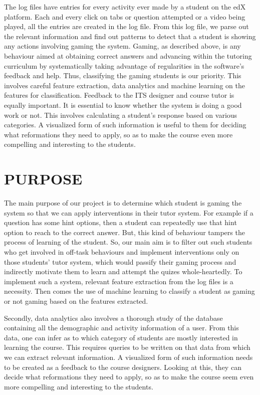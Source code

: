 \documentclass[a4paper,12pt,oneside]{sphinxmanual}
\begin{document}
The log files have entries for every activity ever made by a student on the edX platform. Each and every click on tabs or question attempted or a video being played, all the entries are created in the log file. From this log file, we parse out the relevant information and find out patterns to detect that a student is showing any actions involving gaming the system. Gaming, as described above, is any behaviour aimed at obtaining correct answers and advancing within the tutoring curriculum by systematically taking advantage of regularities in the software’s feedback and help. Thus, classifying the gaming students is our priority. This involves careful feature extraction, data analytics and machine learning on the features for classification.
Feedback to the ITS designer and course tutor is equally important. It is essential to know whether the system is doing a good work or not. This involves calculating a student's response based on various categories. A visualized form of such information is useful to them for deciding what reformations they need to apply, so as to make the course even more compelling and interesting to the students.


\section{\textbf{PURPOSE}}
\label{document:purpose}
The main purpose of our project is to determine which student is gaming the system so that we can apply interventions in their tutor system. For example if a question has some hint options, then a student can repeatedly use that hint option to reach to the correct answer. But, this kind of behaviour tampers the process of learning of the student. So, our main aim is to filter out such students who get involved in off-task behaviours and implement interventions only on those students' tutor system, which would passify their gaming process and indirectly motivate them to learn and attempt the quizes whole-heartedly. To implement such a system, relevant feature extraction from the log files is a necessity. Then comes the use of machine learning to classify a student as gaming or not gaming based on the features extracted.

Secondly, data analytics also involves a thorough study of the database containing all the demographic and activity information of a user. From this data, one can infer as to which category of students are mostly interested in learning the course. This requires queries to be written on that data from which we can extract relevant information. A visualized form of such information needs to be created as a feedback to the course designers. Looking at this, they can decide what reformations they need to apply, so as to make the course seem even more compelling and interesting to the students.
\end{document}
